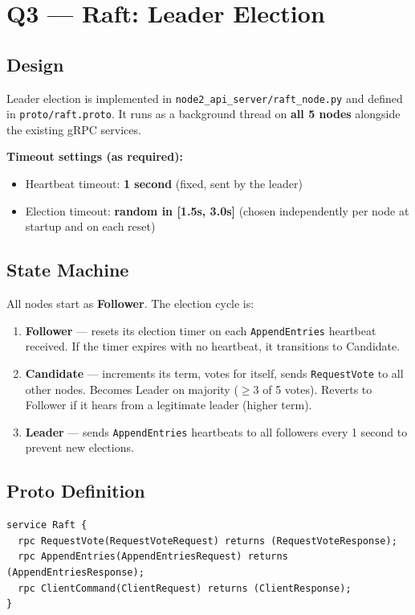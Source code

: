 \section{Q3 — Raft: Leader Election}

\subsection*{Design}

Leader election is implemented in \texttt{node2\_api\_server/raft\_node.py}
and defined in \texttt{proto/raft.proto}. It runs as a background thread
on \textbf{all 5 nodes} alongside the existing gRPC services.

\textbf{Timeout settings (as required):}
\begin{itemize}
  \item Heartbeat timeout: \textbf{1 second} (fixed, sent by the leader)
  \item Election timeout: \textbf{random in [1.5s, 3.0s]} (chosen independently per node at startup and on each reset)
\end{itemize}

\subsection*{State Machine}

All nodes start as \textbf{Follower}. The election cycle is:

\begin{enumerate}
  \item \textbf{Follower} — resets its election timer on each \texttt{AppendEntries} heartbeat received.
        If the timer expires with no heartbeat, it transitions to Candidate.
  \item \textbf{Candidate} — increments its term, votes for itself, sends \texttt{RequestVote}
        to all other nodes. Becomes Leader on majority ($\geq 3$ of 5 votes).
        Reverts to Follower if it hears from a legitimate leader (higher term).
  \item \textbf{Leader} — sends \texttt{AppendEntries} heartbeats to all followers every 1 second
        to prevent new elections.
\end{enumerate}

\subsection*{Proto Definition}

\begin{lstlisting}[language={}]
service Raft {
  rpc RequestVote(RequestVoteRequest) returns (RequestVoteResponse);
  rpc AppendEntries(AppendEntriesRequest) returns (AppendEntriesResponse);
  rpc ClientCommand(ClientRequest) returns (ClientResponse);
}
\end{lstlisting}

